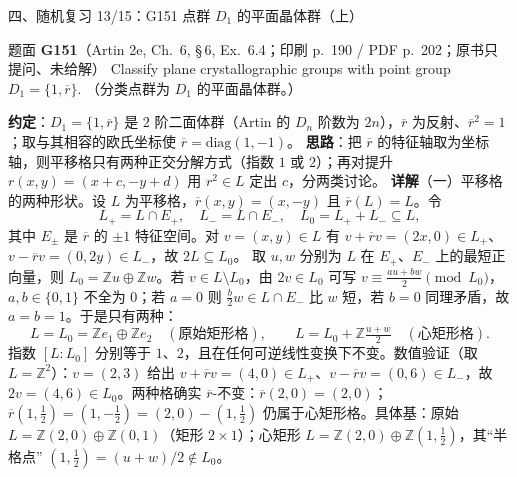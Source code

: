 \documentclass[aspectratio=169,10pt,fontset=none]{ctexbeamer}
\newcommand{\ex}[1]{\textcolor{accent}{\footnotesize\bfseries #1}}
\newcommand{\key}[1]{\textcolor{ink}{\bfseries #1}}
\begin{document}
\begin{frame}[t]{四、随机复习 13/15：G151 点群 $D_1$ 的平面晶体群（上）}
\label{ex:G151}
\scriptsize
\begin{block}{\footnotesize 题面 \ex{G151}（Artin 2e, Ch.~6, \S\,6, Ex.~6.4；印刷 p.~190 / PDF p.~202；原书只提问、未给解）}
Classify plane crystallographic groups with point group $D_1=\{1,\overline r\}$.
（分类点群为 $D_1$ 的平面晶体群。）
\end{block}
\key{约定}：$D_1=\{1,\overline r\}$ 是 $2$ 阶二面体群（Artin 的 $D_n$ 阶数为 $2n$），$\overline r$ 为反射、$\overline r^2=1$；取与其相容的欧氏坐标使 $\overline r=\mathrm{diag}(1,-1)$。
\key{思路}：把 $\overline r$ 的特征轴取为坐标轴，则平移格只有两种正交分解方式（指数 $1$ 或 $2$）；再对提升 $r(x,y)=(x+c,-y+d)$ 用 $r^2\in L$ 定出 $c$，分两类讨论。
\key{详解}（一）平移格的两种形状。设 $L$ 为平移格，$\overline r(x,y)=(x,-y)$ 且 $\overline r(L)=L$。令
\[ L_+=L\cap E_+,\quad L_-=L\cap E_-,\quad L_0=L_++L_-\subseteq L, \]
其中 $E_\pm$ 是 $\overline r$ 的 $\pm1$ 特征空间。对 $v=(x,y)\in L$ 有 $v+\overline rv=(2x,0)\in L_+$、$v-\overline rv=(0,2y)\in L_-$，故 $2L\subseteq L_0$。
取 $u,w$ 分别为 $L$ 在 $E_+$、$E_-$ 上的最短正向量，则 $L_0=\mathbb Zu\oplus\mathbb Zw$。若 $v\in L\setminus L_0$，由 $2v\in L_0$ 可写 $v\equiv\frac{au+bw}{2}\pmod{L_0}$，$a,b\in\{0,1\}$ 不全为 $0$；若 $a=0$ 则 $\frac{b}{2}w\in L\cap E_-$ 比 $w$ 短，若 $b=0$ 同理矛盾，故 $a=b=1$。于是只有两种：
\[
L=L_0=\mathbb Ze_1\oplus\mathbb Ze_2\quad(\text{原始矩形格}),\qquad
L=L_0+\mathbb Z\tfrac{u+w}{2}\quad(\text{心矩形格}).
\]
指数 $[L:L_0]$ 分别等于 $1$、$2$，且在任何可逆线性变换下不变。数值验证（取 $L=\mathbb Z^2$）：$v=(2,3)$ 给出 $v+\overline rv=(4,0)\in L_+$、$v-\overline rv=(0,6)\in L_-$，故 $2v=(4,6)\in L_0$。两种格确实 $\overline r$-不变：$\overline r(2,0)=(2,0)$；$\overline r(1,\tfrac12)=(1,-\tfrac12)=(2,0)-(1,\tfrac12)$ 仍属于心矩形格。具体基：原始 $L=\mathbb Z(2,0)\oplus\mathbb Z(0,1)$（矩形 $2\times1$）；心矩形 $L=\mathbb Z(2,0)\oplus\mathbb Z(1,\tfrac12)$，其“半格点” $(1,\tfrac12)=(u+w)/2\notin L_0$。
\end{frame}
\end{document}
